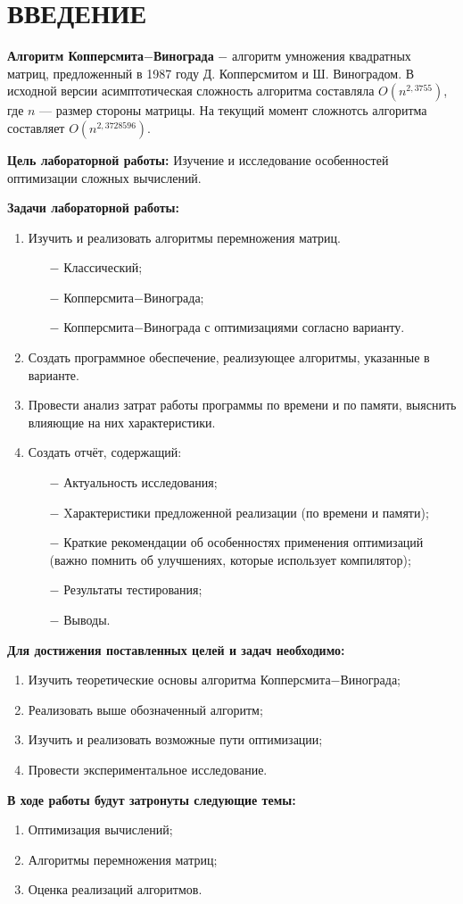 \chapter*{ВВЕДЕНИЕ}

\textbf{Алгоритм Копперсмита$-$Винограда}\cite{winograd} $-$ алгоритм умножения квадратных матриц, предложенный в 1987 году Д. Копперсмитом и Ш. Виноградом.
В исходной версии асимптотическая сложность алгоритма составляла $O(n^{2,3755})$, где  $n$ — размер стороны матрицы.
На текущий момент сложнотсь алгоритма составляет $O(n^{2,3728596})$.

\textbf{Цель лабораторной работы:}
Изучение и исследование особенностей оптимизации сложных вычислений.

\textbf{Задачи лабораторной работы:}
\begin{enumerate}
\item Изучить и реализовать алгоритмы перемножения матриц.
\begin{enumerate}
    \item[$-$] Классический;
    \item[$-$] Копперсмита$-$Винограда;
    \item[$-$] Копперсмита$-$Винограда с оптимизациями согласно варианту.
\end{enumerate}
\item Создать программное обеспечение, реализующее алгоритмы, указанные в варианте.
\item Провести анализ затрат работы программы по времени и по памяти, выяснить влияющие на них характеристики.
    \item Создать отчёт, содержащий:
    \begin{enumerate}
        \item[$-$] Актуальность исследования;
        \item[$-$] Xарактеристики предложенной реализации (по времени и памяти);
        \item[$-$] Краткие рекомендации об особенностях применения оптимизаций (важно помнить об улучшениях, которые использует компилятор);
        \item[$-$] Результаты тестирования;
        \item[$-$] Выводы.
    \end{enumerate}
\end{enumerate}
\newpage
\textbf{Для достижения поставленных целей и задач необходимо:}
\begin{enumerate}
    \item Изучить теоретические основы алгоритма Копперсмита$-$Винограда;
    \item Реализовать выше обозначенный алгоритм;
    \item Изучить и реализовать возможные пути оптимизации;
    \item Провести экспериментальное исследование.
\end{enumerate}

\textbf{В ходе работы будут затронуты следующие темы:}
\begin{enumerate}
    \item Оптимизация вычислений;
    \item Алгоритмы перемножения матриц;
    \item Оценка реализаций алгоритмов.
\end{enumerate}
